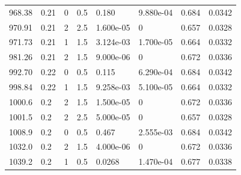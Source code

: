 \documentclass[preview]{standalone}
\begin{document}
{{{\begin{tabular}{L{1.2cm}C{1.2cm} C{0.3cm}C{0.5cm} C{1.4cm}C{1.4cm} C{1.4cm}C{1.4cm}}
  968.38  &  0.21  & 0     & 0.5 &  0.180  & 9.880e-04  & 0.684 &  0.0342   \\ 
  970.91  &  0.21  & 2     & 2.5 &  1.600e-05  & 0  & 0.657 &  0.0328   \\ 
  971.73  &  0.21  & 1     & 1.5 &  3.124e-03  & 1.700e-05  & 0.664 &  0.0332   \\ 
  981.26  &  0.21  & 2     & 1.5 &  9.000e-06  & 0  & 0.672 &  0.0336   \\ 
  992.70  &  0.22  & 0     & 0.5 &  0.115  & 6.290e-04  & 0.684 &  0.0342   \\ 
  998.84  &  0.22  & 1     & 1.5 &  9.258e-03  & 5.100e-05  & 0.664 &  0.0332   \\ 
  1000.6  &   0.2  & 2     & 1.5 &  1.500e-05  & 0  & 0.672 &  0.0336   \\ 
  1001.5  &   0.2  & 2     & 2.5 &  5.000e-05  & 0  & 0.657 &  0.0328   \\ 
  1008.9  &   0.2  & 0     & 0.5 &  0.467  & 2.555e-03  & 0.684 &  0.0342   \\ 
  1032.0  &   0.2  & 2     & 1.5 &  4.000e-06  & 0  & 0.672 &  0.0336   \\ 
  1039.2  &   0.2  & 1     & 0.5 &  0.0268  & 1.470e-04  & 0.677 &  0.0338   \\ 
\hline 
\end{tabular} 

}}}
\end{document}
